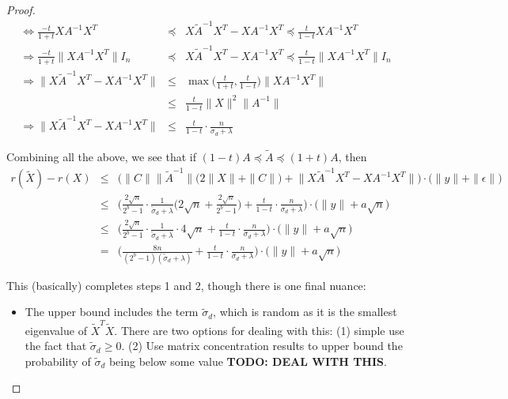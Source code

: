 \documentclass[12pt]{article}
\newcommand{\tsigma}{\tilde{\sigma}}
\newcommand{\eps}{\epsilon}
\newcommand{\tA}{\tilde{A}}
\newcommand{\tX}{\tilde{X}}
\begin{document}
\begin{proof}
\begin{eqnarray*}
\Longleftrightarrow \frac{-t}{1+t}X A^{-1}X^T &\preceq& X \tA^{-1}X^T - XA^{-1}X^T \preceq \frac{t}{1-t}X A^{-1}X^T \\
\Longrightarrow \frac{-t}{1+t}\|XA^{-1}X^T\| I_n &\preceq&  X \tA^{-1}X^T - XA^{-1}X^T \preceq \frac{t}{1-t}\|X A^{-1}X^T\|I_n \\
\Longrightarrow  \|X \tA^{-1}X^T - XA^{-1}X^T\| &\leq&  \max\Big(\frac{t}{1+t},\frac{t}{1-t}\Big)\|X A^{-1}X^T\|\\
&\leq&  \frac{t}{1-t}\|X\|^2 \|A^{-1}\|\\
\Longrightarrow  \|X \tA^{-1}X^T - XA^{-1}X^T\| &\leq&  \frac{t}{1-t}\cdot \frac{n}{\sigma_d+\lambda}
\end{eqnarray*}

Combining all the above, we see that if $(1-t)A \preceq \tA \preceq (1+t)A$, then
\begin{eqnarray*}
r(\tX) - r(X) &\leq& \bigg(\|C\| \|\tA^{-1}\|\Big(2\|X\| + \|C\|\Big) + \big\|X \tA^{-1} X^T - X A^{-1} X^T\big\|\bigg)\cdot \big(\|y\| + \|\eps\|\big) \\
&\leq& \bigg(\frac{2\sqrt{n}}{2^b-1}\cdot \frac{1}{\tsigma_d + \lambda}\Big(2\sqrt{n} +\frac{2\sqrt{n}}{2^b-1}\Big) +\frac{t}{1-t}\cdot \frac{n}{\sigma_d+\lambda}\bigg)\cdot \big(\|y\| + a\sqrt{n}\big) \\
&\leq& \bigg(\frac{2\sqrt{n}}{2^b-1}\cdot \frac{1}{\tsigma_d + \lambda}\cdot 4\sqrt{n} +\frac{t}{1-t}\cdot \frac{n}{\sigma_d+\lambda}\bigg)\cdot \big(\|y\| + a\sqrt{n}\big) \\
&=& \bigg(\frac{8n}{(2^b-1)(\tsigma_d + \lambda)} +\frac{t}{1-t}\cdot \frac{n}{\sigma_d+\lambda}\bigg)\cdot \big(\|y\| + a\sqrt{n}\big) 
\end{eqnarray*}

This (basically) completes steps 1 and 2, though there is one final nuance:
\begin{itemize}
\item The upper bound includes the term $\tsigma_d$, which is random as it is the smallest eigenvalue of $\tX^T\tX$. There are two options for dealing with this: (1) simple use the fact that $\tsigma_d \geq 0$. (2) Use matrix concentration results to upper bound the probability of $\tsigma_d$ being below some value \textbf{TODO: DEAL WITH THIS}.
\end{itemize}


\end{proof}
\end{document}
